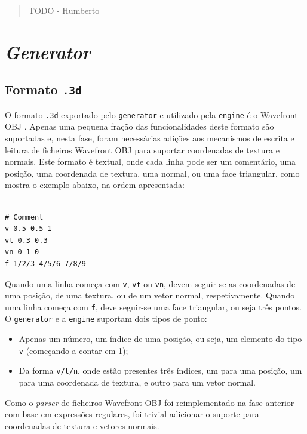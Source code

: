 \documentclass[12pt, a4paper]{article}
\begin{document}
\pagebreak

\begin{abstract}
    \noindent
    {\color{red} TODO - Humberto}
\end{abstract}

\section{\emph{Generator}}

\subsection{Formato \texttt{.3d}}

O formato \texttt{.3d} exportado pelo \texttt{generator} e utilizado pela \texttt{engine} é o
Wavefront OBJ \cite{wavefront-obj}. Apenas uma pequena fração das funcionalidades deste formato
são suportadas e, nesta fase, foram necessárias adições aos mecanismos de escrita e leitura de
ficheiros Wavefront OBJ para suportar coordenadas de textura e normais. Este formato é textual, onde
cada linha pode ser um comentário, uma posição, uma coordenada de textura, uma normal, ou uma face
triangular, como mostra o exemplo abaixo, na ordem apresentada:

\begin{lstlisting}

# Comment
v 0.5 0.5 1
vt 0.3 0.3
vn 0 1 0
f 1/2/3 4/5/6 7/8/9
\end{lstlisting}

Quando uma linha começa com \texttt{v}, \texttt{vt} ou \texttt{vn}, devem seguir-se as coordenadas
de uma posição, de uma textura, ou de um vetor normal, respetivamente. Quando uma linha começa com
\texttt{f}, deve seguir-se uma face triangular, ou seja três pontos. O \texttt{generator} e a
\texttt{engine} suportam dois tipos de ponto:

\begin{itemize}
    \item Apenas um número, um índice de uma posição, ou seja, um elemento do tipo \texttt{v}
        (começando a contar em 1);
    \item Da forma \texttt{v/t/n}, onde estão presentes três índices, um para uma posição, um para
        uma coordenada de textura, e outro para um vetor normal.
\end{itemize}

Como o \emph{parser} de ficheiros Wavefront OBJ foi reimplementado na fase anterior com base em
expressões regulares, foi trivial adicionar o suporte para coordenadas de textura e vetores normais.
\end{document}
